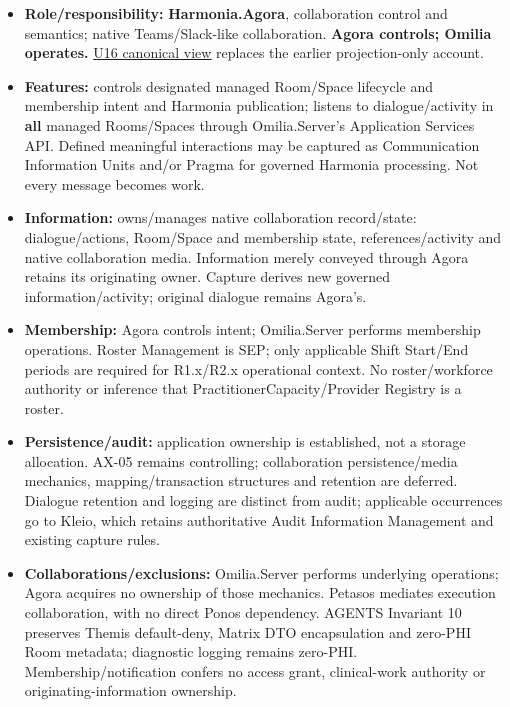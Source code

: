 \begin{itemize}


\item \textbf{Role/responsibility:} \textbf{Harmonia.Agora}, collaboration control and semantics;
  native Teams/Slack-like collaboration. \textbf{Agora controls; Omilia operates.}
  \hyperref[element:d1c4053e68384080b8eb79d2008632ba]{U16 canonical view}
  replaces the earlier projection-only account.

\item \textbf{Features:} controls designated managed Room/Space lifecycle and membership
  intent and Harmonia publication; listens to dialogue/activity in \textbf{all} managed
  Rooms/Spaces through Omilia.Server's Application Services API. Defined meaningful
  interactions may be captured as Communication Information Units and/or Pragma
  for governed Harmonia processing. Not every message becomes work.

\item \textbf{Information:} owns/manages native collaboration record/state: dialogue/actions,
  Room/Space and membership state, references/activity and native collaboration
  media. Information merely conveyed through Agora retains its originating owner.
  Capture derives new governed information/activity; original dialogue remains Agora's.

\item \textbf{Membership:} Agora controls intent; Omilia.Server performs membership
  operations. Roster Management is SEP; only applicable Shift Start/End periods
  are required for R1.x/R2.x operational context. No roster/workforce authority or
  inference that PractitionerCapacity/Provider Registry is a roster.

\item \textbf{Persistence/audit:} application ownership is established, not a storage
  allocation. AX-05 remains controlling; collaboration persistence/media mechanics,
  mapping/transaction structures and retention are deferred. Dialogue retention
  and logging are distinct from audit; applicable occurrences go to Kleio, which
  retains authoritative Audit Information Management and existing capture rules.

\item \textbf{Collaborations/exclusions:} Omilia.Server performs underlying operations;
  Agora acquires no ownership of those mechanics. Petasos mediates execution
  collaboration, with no direct Ponos dependency. AGENTS Invariant 10 preserves
  Themis default-deny, Matrix DTO encapsulation and zero-PHI Room metadata;
  diagnostic logging remains zero-PHI. Membership/notification confers no access
  grant, clinical-work authority or originating-information ownership.


\end{itemize}
